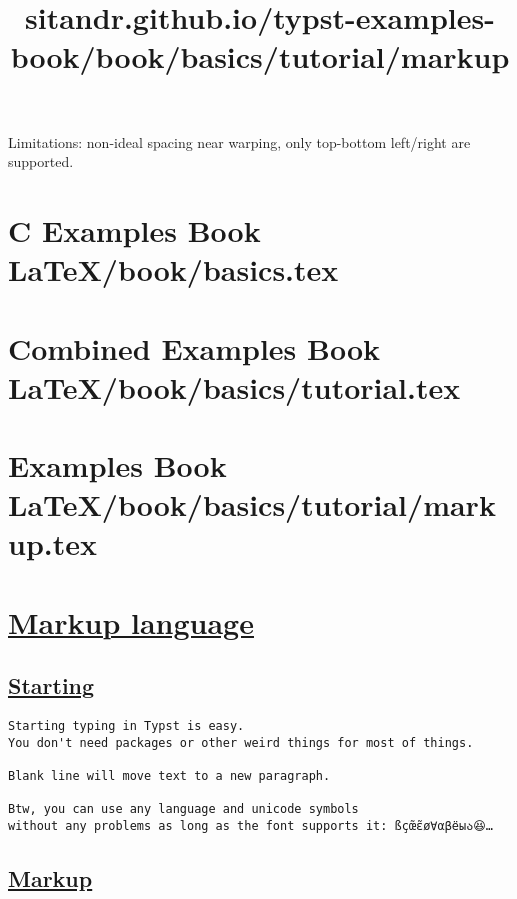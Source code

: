 \pandocbounded{}

Limitations: non-ideal spacing near warping, only top-bottom left/right
are supported.






\section{C Examples Book LaTeX/book/basics.tex}
\section{Combined Examples Book LaTeX/book/basics/tutorial.tex}
\section{Examples Book LaTeX/book/basics/tutorial/markup.tex}
\title{sitandr.github.io/typst-examples-book/book/basics/tutorial/markup}

\section{\texorpdfstring{\hyperref[markup-language]{Markup
language}}{Markup language}}\label{markup-language}

\subsection{\texorpdfstring{\hyperref[starting]{Starting}}{Starting}}\label{starting}

\begin{verbatim}
Starting typing in Typst is easy.
You don't need packages or other weird things for most of things.

Blank line will move text to a new paragraph.

Btw, you can use any language and unicode symbols
without any problems as long as the font supports it: ßçœ̃ɛ̃ø∀αβёыა😆…
\end{verbatim}

\pandocbounded{}

\subsection{\texorpdfstring{\hyperref[markup]{Markup}}{Markup}}\label{markup}

